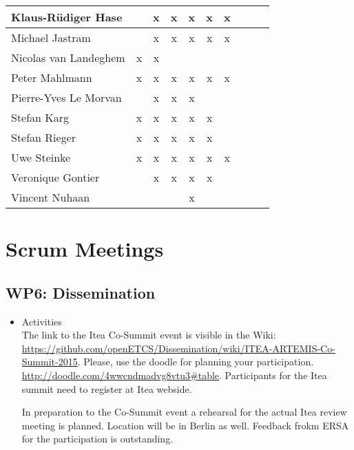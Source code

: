 \documentclass[a4paper, 11pt]{article}
\begin{document}
\begin{tabular}{|l|c|c|c||c|c|c||c|c|c|}
Klaus-R\"udiger Hase &   & x & x & x & x & x \\\hline
Michael Jastram      &   & x & x & x & x & x \\\hline
Nicolas van Landeghem& x & x &   &   &   &   \\\hline
Peter Mahlmann       & x & x & x & x & x & x \\\hline
Pierre-Yves Le Morvan&   & x & x & x &   &   \\\hline
Stefan Karg          & x & x & x & x & x &   \\\hline
Stefan Rieger        & x & x & x & x & x &   \\\hline
Uwe Steinke          & x & x & x & x & x & x \\\hline
Veronique Gontier    &   & x & x & x & x &   \\\hline
Vincent Nuhaan       &   &   &   & x &   &   \\\hline
\end{tabular}


\section{Scrum Meetings}

\subsection{WP6: Dissemination}
\begin{itemize}
\item Activities\\
The link to the Itea Co-Summit event is visible in the Wiki:
\url{https://github.com/openETCS/Dissemination/wiki/ITEA-ARTEMIS-Co-Summit-2015}. Please, use the doodle for planning your participation.
\url{http://doodle.com/4wwcndmadvg8vtu3#table}. Participants for the Itea summit need to register at Itea webside.

In preparation to the Co-Summit event a rehearsal for the actual Itea review meeting is planned. Location will be in Berlin as well.
Feedback frokm ERSA for the participation is outstanding.

\end{itemize}
\end{document}

